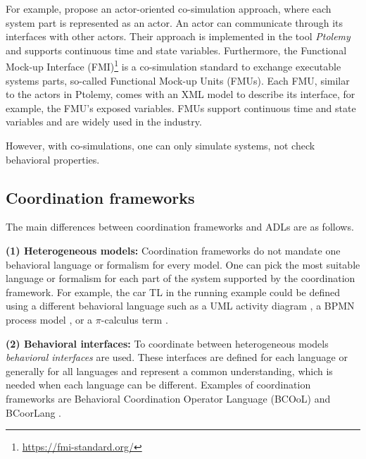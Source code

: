 \documentclass[runningheads]{llncs}
\begin{document}
For example, \cite{ekerTamingHeterogeneityPtolemy2003} propose an actor-oriented co-simulation approach, where each system part is represented as an actor.
An actor can communicate through its interfaces with other actors.
Their approach is implemented in the tool \textit{Ptolemy} and supports continuous time and state variables.
Furthermore, the Functional Mock-up Interface (FMI)\footnote{\url{https://fmi-standard.org/}} is a co-simulation standard to exchange executable systems parts, so-called Functional Mock-up Units (FMUs).
Each FMU, similar to the actors in Ptolemy, comes with an XML model to describe its interface, for example, the FMU's exposed variables.
FMUs support continuous time and state variables and are widely used in the industry.

However, with co-simulations, one can only simulate systems, not check behavioral properties.

\subsection{Coordination frameworks} \label{subsec:frameworks}

The main differences between coordination frameworks and ADLs are as follows.

\textbf{(1) Heterogeneous models:} Coordination frameworks do not mandate one behavioral language or formalism for every model.
One can pick the most suitable language or formalism for each part of the system supported by the coordination framework.
For example, the car TL in the running example could be defined using a different behavioral language such as a UML activity diagram \cite{objectmanagementgroupUnifiedModelingLanguage2017}, a BPMN process model \cite{objectmanagementgroupBusinessProcessModel2013}, or a $\pi$-calculus term \cite{milnerCommunicatingMobileSystems2010}.

\textbf{(2) Behavioral interfaces:} To coordinate between heterogeneous models \textit{behavioral interfaces} are used.
These interfaces are defined for each language or generally for all languages and represent a common understanding, which is needed when each language can be different.
Examples of coordination frameworks are Behavioral Coordination Operator Language (BCOoL) \cite{varalarsenBCOolBehavioralCoordination2016,varalarsenBehavioralCoordinationOperator2015} and BCoorLang \cite{krauterBehavioralConsistencyMultimodeling2023}.
\end{document}
